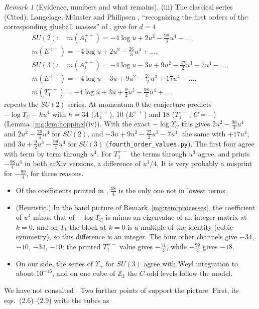 \documentclass[11pt,a4paper]{article}
\theoremstyle{definition}
\theoremstyle{remark}
\newtheorem{remark}[theorem]{Remark}
\begin{document}
\begin{remark}[Evidence, numbers and what remains]
(iii) The classical series (Cited). Langelage, Münster and Philipsen \cite[eqs.~(2.14)--(2.18)]{LMP07}, ``recognizing the first orders of the corresponding
glueball masses'' of \cite{Mun81,Seo82}, give for $d=4$
\begin{gather*}
SU(2):\quad m(A_1^{++})=-4\log u+2u^2-\tfrac{98}3u^4-\dots,\\
m(E^{++})=-4\log u+2u^2-\tfrac{26}3u^4+\dots,\\
SU(3):\quad m(A_1^{++})=-4\log u-3u+9u^2-\tfrac{27}2u^3-7u^4-\dots,\\
m(E^{++})=-4\log u-3u+9u^2-\tfrac{27}2u^3+17u^4-\dots,\\
m(T_1^{+-})=-4\log u+3u+\tfrac92u^3-\tfrac{98}4u^4+\dots
\end{gather*}
\cite[eq.~(29)]{LMP08} repeats the $SU(2)$ series. At momentum $0$ the conjecture predicts $-\log\Upsilon_C-hu^4$ with $h=34$ ($A_1^{++}$), $10$ ($E^{++}$) and
$18$ ($T_1^{+-}$, $C=-$) (Lemma~\ref{mg:lem:hopping}(iv)). With the exact $-\log\Upsilon_C$ this gives $2u^2-\frac{98}3u^4$ and $2u^2-\frac{26}3u^4$ for $SU(2)$, and
$-3u+9u^2-\frac{27}2u^3-7u^4$, the same with $+17u^4$, and $3u+\frac92u^3-\frac{99}4u^4$ for $SU(3)$ (\texttt{fourth\_order\_values.py}). The first four agree
with \cite{LMP07} term by term through $u^4$. For $T_1^{+-}$ the terms through $u^3$ agree, and \cite{LMP07} prints $-\frac{98}4u^4$ in both arXiv versions,
a difference of $u^4/4$. It is very probably a misprint for $-\frac{99}4$, for three reasons.
\begin{itemize}
\item Of the coefficients printed in \cite[eqs.~(2.14)--(2.18)]{LMP07}, $\frac{98}4$ is the only one not in lowest terms.
\item (Heuristic.) In the band picture of Remark~\ref{mg:rem:processes}, the coefficient of $u^4$ minus that of $-\log\Upsilon_C$ is minus an eigenvalue of an integer
matrix at $k=0$, and on $T_1$ the block at $k=0$ is a multiple of the identity (cubic symmetry), so this difference is an integer. The four other channels
give $-34$, $-10$, $-34$, $-10$; the printed $T_1^{+-}$ value gives $-\frac{71}4$, while $-\frac{99}4$ gives $-18$.
\item On our side, the series of $\Upsilon_\pm$ for $SU(3)$ agree with Weyl integration to about $10^{-16}$, and on one cube of $\mathbb Z_3$ the $C$-odd levels follow
the model.
\end{itemize}
We have not consulted \cite{Mun81,Seo82}. Two further points of \cite{LMP07} support the picture. First, its eqs.~(2.6)--(2.9) write the tubes as

\end{remark}
\end{document}
